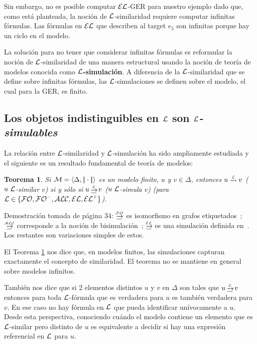 Sin embargo, no es posible computar $\mathcal{EL}$-GER para nuestro ejemplo dado que, como est\'a planteada, la noci\'on de $\mathcal{L}$-similaridad requiere computar infinitas f\'ormulas. Las f\'ormulas en $\mathcal{EL}$ que describen al target $e_5$ son infinitas porque hay un ciclo en el modelo.

La soluci\'on para no tener que considerar infinitas f\'ormulas es reformular la noci\'on de $\mathcal{L}$-similaridad de una manera estructural usando la noci\'on de teor\'ia de modelos conocida como {\bf $\mathcal{L}$-simulaci\'on}. A diferencia de la $\mathcal{L}$-similaridad que se define sobre infinitas f\'ormulas, las $\mathcal{L}$-simulaciones se definen sobre el modelo, el cual para la GER, es finito.

\subsection{Los objetos indistinguibles en $\mathcal{L}$ son \emph{$\mathcal{L}$-simulables}}

La relaci\'on entre $\mathcal{L}$-similaridad y $\mathcal{L}$-simulaci\'on ha sido ampliamente estudiada y el siguiente es un resultado fundamental de teor\'ia de modelos:


\newtheorem{teorema}{Teorema}
\begin{teorema} \label{thm:simulation}
Si  $\mathcal{M} = \langle \Delta, |\!|\cdot|\!| \rangle$ es un modelo finito, $u$ y $v \in \Delta$, entonces $u \simil{\+L} v$ ($u~\mathcal{L}$-similar $v$) si y s\'olo si 
$u \simul{\+L} v$ ($u~\mathcal{L}$-simula $v$) (para $\mathcal{L} \in \{\mathcal{FO},{\mathcal{FO}^-},\mathcal{ALC},\mathcal{EL},{\mathcal{EL}^+}\}$).
\end{teorema}

Demostraci\'on tomada de \cite{arec:usin11} p\'agina 34: $\simul{\FOL}$ es isomorfismo en
grafos etiquetados~\cite{ebbi:math96}; $\simul{\ALC}$ corresponde a la
noci\'on de bisimulaci\'on~\cite[Def.~2.16]{BRV01}; $\simul{\EL}$ es una
simulaci\'on definida en~\cite[Def.~2.77]{BRV01}. Los restantes son variaciones simples de estos.

El Teorema \ref{thm:simulation} nos dice que, en modelos finitos, las simulaciones capturan exactamente el concepto de similaridad. El teorema no se mantiene en general sobre modelos infinitos.

Tambi\'en nos dice que si 2 elementos distintos $u$ y $v$ en $\Delta$ son tales que $u
\simul{\+L} v$ entonces para toda $\mathcal{L}$-f\'ormula que es verdadera para $u$ es tambi\'en verdadera para $v$. En ese caso no hay f\'ormula en $\mathcal{L}$ que pueda identificar un\'ivocamente a $u$. Desde esta perspectiva, conociendo cu\'ando el modelo contiene un elemento que es $\mathcal{L}$-similar pero distinto de $u$ es
equivalente a decidir si hay una expresi\'on referencial en $\mathcal{L}$ para $u$.

